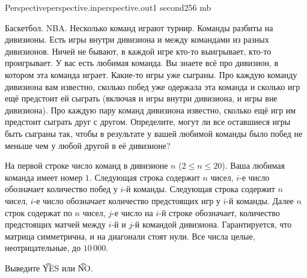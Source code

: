 
\begin{problem}{Perspective}{perspective.in}{perspective.out}{1 second}{256 mb}{}

Баскетбол. NBA. Несколько команд играют турнир.
Команды разбиты на дивизионы. Есть игры внутри дивизиона и между командами из разных дивизионов.
Ничей не бывают, в каждой игре кто-то выигрывает, кто-то проигрывает.
У вас есть любимая команда. Вы знаете всё про дивизион, в котором эта команда играет.
Какие-то игры уже сыграны. 
Про каждую команду дивизиона вам известно, сколько побед уже одержала эта команда
и сколько игр ещё предстоит ей сыграть (включая и игры внутри дивизиона, и игры вне дивизиона).
Про каждую пару команд дивизиона известно, сколько ещё игр им предстоит сыграть друг с другом.
Определите, могут ли все оставшиеся игры быть сыграны так, чтобы в результате 
у вашей любимой команды было побед не меньше чем у любой другой в её дивизионе?

\InputFile

На первой строке число команд в дивизионе $n$ ($2 \le n \le 20$).
Ваша любимая команда имеет номер $1$.
Следующая строка содержит $n$ чисел, $i$-е число обозначает количество побед у $i$-й команды.
Следующая строка содержит $n$ чисел, $i$-е число обозначает количество предстоящих игр у $i$-й команды.
Далее $n$ строк содержат по $n$ чисел,
$j$-е число на $i$-й строке обозначает, количество предстоящих матчей между $i$-й и $j$-й командой дивизиона.
Гарантируется, что матрица симметрична, и на диагонали стоят нули.
Все числа целые, неотрицательные, до $10\,000$.

\OutputFile

Выведите \t{YES} или \t{NO}.

\Example

\begin{example}
%
%
\end{example}

\end{problem}

